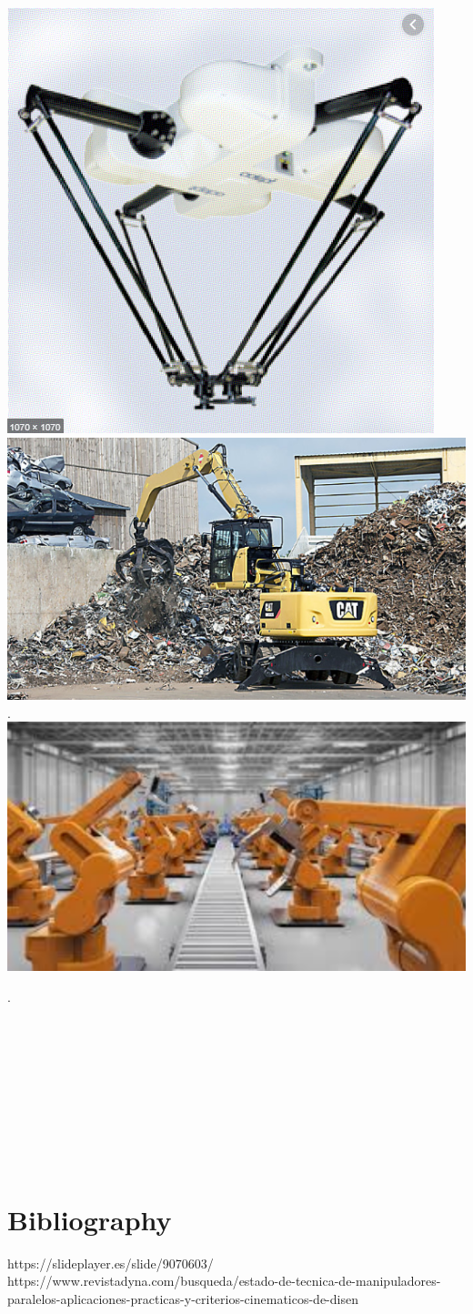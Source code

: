 \documentclass[12pt,a4paper]{article}
\begin{document}
\begin{center}
\includegraphics[scale=1]{2.PNG} 
\includegraphics[scale=1.2]{5.PNG} 
.\\
\includegraphics[scale=1.2]{6.PNG}
\end{center}
.\\\\\\\\\\\\\\\\\\\
\section{Bibliography}
https://slideplayer.es/slide/9070603/ \\
https://www.revistadyna.com/busqueda/estado-de-tecnica-de-manipuladores-paralelos-aplicaciones-practicas-y-criterios-cinematicos-de-disen \\
\end{document}

